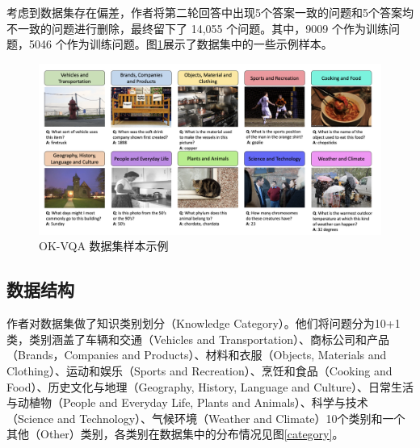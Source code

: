 \documentclass[conference,10pt]{IEEEtran}
\begin{document}
考虑到数据集存在偏差，作者将第二轮回答中出现5个答案一致的问题和5个答案均不一致的问题进行删除，最终留下了 14,055 个问题。其中，9009 个作为训练问题，5046 个作为训练问题。图\ref{sample}展示了数据集中的一些示例样本。
\begin{figure}
	\centering
	\includegraphics[scale=0.3]{figure/sample.png}
	\caption{OK-VQA 数据集样本示例}
	\label{sample}
\end{figure}
\subsection{数据结构}
作者对数据集做了知识类别划分（Knowledge Category）。他们将问题分为10+1类，类别涵盖了车辆和交通（Vehicles and Transportation）、商标公司和产品（Brands，Companies and Products）、材料和衣服（Objects, Materials and Clothing）、运动和娱乐（Sports and Recreation）、烹饪和食品（Cooking and Food）、历史文化与地理（Geography, History, Language and Culture）、日常生活与动植物（People and Everyday Life, Plants and Animals）、科学与技术（Science and Technology）、气候环境（Weather and Climate）10个类别和一个其他（Other）类别，各类别在数据集中的分布情况见图\ref{category}。
\end{document}
